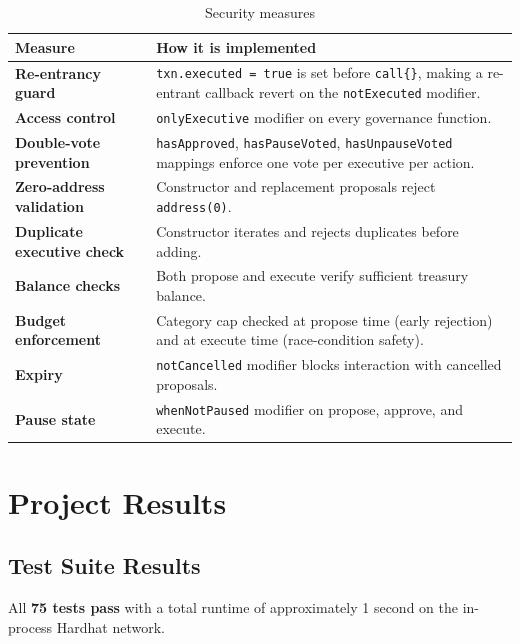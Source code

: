 \documentclass[12pt,a4paper]{article}
\begin{document}
\begin{table}[h]
  \centering
  \begin{tabularx}{\linewidth}{>{\bfseries}lX}
    \toprule
    Measure & How it is implemented \\
    \midrule
    Re-entrancy guard & \texttt{txn.executed = true} is set before \texttt{call\{\}}, making a re-entrant callback revert on the \texttt{notExecuted} modifier. \\
    Access control & \texttt{onlyExecutive} modifier on every governance function. \\
    Double-vote prevention & \texttt{hasApproved}, \texttt{hasPauseVoted}, \texttt{hasUnpauseVoted} mappings enforce one vote per executive per action. \\
    Zero-address validation & Constructor and replacement proposals reject \texttt{address(0)}. \\
    Duplicate executive check & Constructor iterates and rejects duplicates before adding. \\
    Balance checks & Both propose and execute verify sufficient treasury balance. \\
    Budget enforcement & Category cap checked at propose time (early rejection) and at execute time (race-condition safety). \\
    Expiry & \texttt{notCancelled} modifier blocks interaction with cancelled proposals. \\
    Pause state & \texttt{whenNotPaused} modifier on propose, approve, and execute. \\
    \bottomrule
  \end{tabularx}
  \caption{Security measures}
\end{table}

\section{Project Results}

\subsection{Test Suite Results}

All \textbf{75 tests pass} with a total runtime of approximately 1 second on the in-process Hardhat network.
\end{document}
